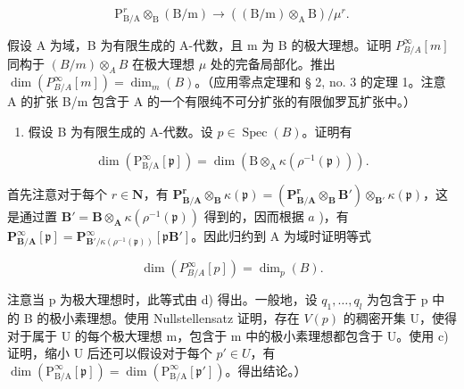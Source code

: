 \[
\mathrm{P} _ {\mathrm{B/A}} ^ {r} \otimes_ {\mathrm{B}} (\mathrm{B/m}) \rightarrow ((\mathrm{B/m}) \otimes_ {\mathrm{A}} \mathrm{B}) / \mu^ {r}.
\]

假设 A 为域，B 为有限生成的 A-代数，且 m 为 B 的极大理想。证明 \(P_{B/A}^{\infty}[m]\) 同构于 \((B/m)\otimes_{A}B\) 在极大理想 \(\mu\) 处的完备局部化。推出 \(\dim(P_{B/A}^{\infty}[m])=\dim_{m}(B)\)。（应用零点定理和 § 2, no. 3 的定理 1。注意 A 的扩张 B/m 包含于 A 的一个有限纯不可分扩张的有限伽罗瓦扩张中。）

\begin{enumerate}
\def\labelenumi{\alph{enumi})}
\setcounter{enumi}{4}
\tightlist
\item
  假设 B 为有限生成的 A-代数。设 \(p \in \operatorname{Spec}(B)\)。证明有
\end{enumerate}

\[
\dim (\mathrm{P} _ {\mathrm{B/A}} ^ {\infty} [ \mathfrak {p} ]) = \dim \left(\mathrm{B} \otimes_ {\mathrm{A}} \kappa (\rho^ {- 1} (\mathfrak {p}))\right).
\]

  首先注意对于每个 \(r \in \mathbf{N}\)，有 \(\mathbf{P}_{\mathbf{B}/\mathbf{A}}^{\mathbf{r}} \otimes_{\mathbf{B}} \kappa(\mathfrak{p}) = (\mathbf{P}_{\mathbf{B}/\mathbf{A}}^{\mathbf{r}} \otimes_{\mathbf{B}} \mathbf{B}') \otimes_{\mathbf{B}'} \kappa(\mathfrak{p})\)，这是通过置 \(\mathbf{B}' = \mathbf{B} \otimes_{\mathbf{A}} \kappa(\rho^{-1}(\mathfrak{p}))\) 得到的，因而根据 \(a\) )，有 \(\mathbf{P}_{\mathbf{B}/\mathbf{A}}^{\infty}[\mathfrak{p}] = \mathbf{P}_{\mathbf{B}' / \kappa(\rho^{-1}(\mathfrak{p}))}^{\infty}[\mathfrak{p}\mathbf{B}']\)。因此归约到 A 为域时证明等式

\[
\dim \left(P _ {B / A} ^ {\infty} [ p ]\right) = \dim_ {p} (B).
\]

注意当 p 为极大理想时，此等式由 d) 得出。一般地，设 \(q_{1}, \ldots, q_{l}\) 为包含于 p 中的 B 的极小素理想。使用 Nullstellensatz 证明，存在 \(V(p)\) 的稠密开集 U，使得对于属于 U 的每个极大理想 m，包含于 m 中的极小素理想都包含于 U。使用 c) 证明，缩小 U 后还可以假设对于每个 \(p' \in U\)，有 \(\dim(\mathrm{P}_{\mathrm{B/A}}^{\infty}[\mathfrak{p}]) = \dim(\mathrm{P}_{\mathrm{B/A}}^{\infty}[\mathfrak{p}'])\)。得出结论。）


